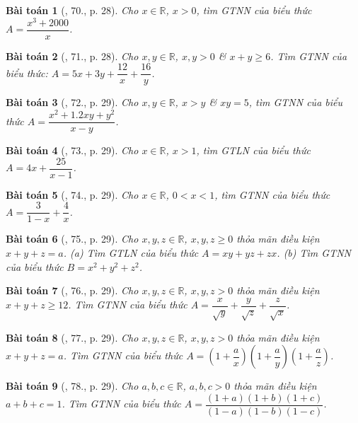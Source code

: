 \documentclass{article}
\newtheorem{baitoan}{Bài toán}
\begin{document}
\begin{baitoan}[\cite{Tuyen_Toan_9}, 70., p. 28]
	Cho $x\in\mathbb{R}$, $x > 0$, tìm {\rm GTNN} của biểu thức $A = \dfrac{x^3 + 2000}{x}$.
\end{baitoan}

\begin{baitoan}[\cite{Tuyen_Toan_9}, 71., p. 28]
	Cho $x,y\in\mathbb{R}$, $x,y > 0$ \& $x + y\ge6$. Tìm {\rm GTNN} của biểu thức: $A = 5x + 3y + \dfrac{12}{x} + \dfrac{16}{y}$.
\end{baitoan}

\begin{baitoan}[\cite{Tuyen_Toan_9}, 72., p. 29]
	Cho $x,y\in\mathbb{R}$, $x > y$ \& $xy = 5$, tìm {\rm GTNN} của biểu thức $A = \dfrac{x^2 + 1.2xy + y^2}{x - y}$.
\end{baitoan}

\begin{baitoan}[\cite{Tuyen_Toan_9}, 73., p. 29]
	Cho $x\in\mathbb{R}$, $x > 1$, tìm {\rm GTLN} của biểu thức $A = 4x + \dfrac{25}{x - 1}$.
\end{baitoan}

\begin{baitoan}[\cite{Tuyen_Toan_9}, 74., p. 29]
	Cho $x\in\mathbb{R}$, $0 < x < 1$, tìm {\rm GTNN} của biểu thức $A = \dfrac{3}{1 - x} + \dfrac{4}{x}$.
\end{baitoan}

\begin{baitoan}[\cite{Tuyen_Toan_9}, 75., p. 29]
	Cho $x,y,z\in\mathbb{R}$, $x,y,z\ge0$ thỏa mãn điều kiện $x + y + z = a$. (a) Tìm {\rm GTLN} của biểu thức $A = xy + yz + zx$. (b) Tìm {\rm GTNN} của biểu thức $B = x^2 + y^2 + z^2$.
\end{baitoan}

\begin{baitoan}[\cite{Tuyen_Toan_9}, 76., p. 29]
	Cho $x,y,z\in\mathbb{R}$, $x,y,z > 0$ thỏa mãn điều kiện $x + y + z\ge12$. Tìm {\rm GTNN} của biểu thức $A = \dfrac{x}{\sqrt{y}} + \dfrac{y}{\sqrt{z}} + \dfrac{z}{\sqrt{x}}$.
\end{baitoan}

\begin{baitoan}[\cite{Tuyen_Toan_9}, 77., p. 29]
	Cho $x,y,z\in\mathbb{R}$, $x,y,z > 0$ thỏa mãn điều kiện $x + y + z = a$. Tìm {\rm GTNN} của biểu thức $A = \left(1 + \dfrac{a}{x}\right)\left(1 + \dfrac{a}{y}\right)\left(1 + \dfrac{a}{z}\right)$.
\end{baitoan}

\begin{baitoan}[\cite{Tuyen_Toan_9}, 78., p. 29]
	Cho $a,b,c\in\mathbb{R}$, $a,b,c > 0$ thỏa mãn điều kiện $a + b + c = 1$. Tìm {\rm GTNN} của biểu thức $A = \dfrac{(1 + a)(1 + b)(1 + c)}{(1 - a)(1 - b)(1 - c)}$.
\end{baitoan}
\end{document}
